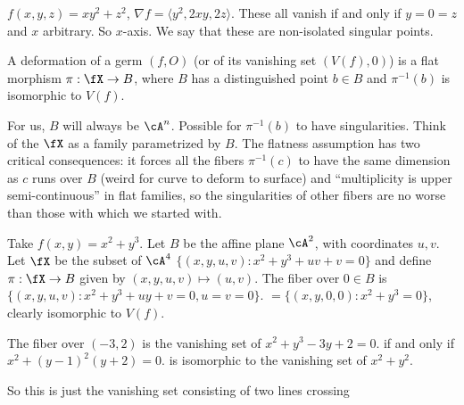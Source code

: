 \begin{ex}
$f(x,y,z)= xy^2+z^2$, $\nabla f=\langle y^2,2xy,2z \rangle$. These all vanish if and only if $y=0=z$ and $x$ arbitrary. So $x$-axis. We say that these are non-isolated singular points. 
\end{ex}



\begin{dfn}[Deformation]
A deformation of a germ $(f,O)$ (or of its vanishing set $(V(f),0)$) is a flat morphism $\pi: \fX \to B$, where $B$ has a distinguished point $b \in B$ and $\pi^{-1}(b)$ is isomorphic to $V(f)$.
\end{dfn}

For us, $B$ will always be $\cA^n$. Possible for $\pi^{-1}(b)$ to have singularities. Think of the $\fX$ as a family parametrized by $B$. The flatness assumption has two critical consequences: it forces all the fibers $\pi^{-1}(c)$ to have the same dimension as $c$ runs over $B$ (weird for curve to deform to surface) and ``multiplicity is upper semi-continuous'' in flat families, so the singularities of other fibers are no worse than those with which we started with. 



\begin{ex}
Take $f(x,y)= x^2+y^3$. Let $B$ be the affine plane $\cA^2$, with coordinates $u,v$. Let $\fX$ be the subset of $\cA^4$ $\{(x,y,u,v) \colon x^2+y^3+uv+v=0\}$ and define $\pi: \fX \to B$ given by $(x,y,u,v) \mapsto (u,v)$. The fiber over $0 \in B$ is $\{(x,y,u,v) \colon x^2+y^3+uy+v=0, u=v=0\}$. $=\{(x,y,0,0) \colon x^2+y^3=0\}$, clearly isomorphic to $V(f)$. 

The fiber over $(-3,2)$ is the vanishing set of $x^2+y^3-3y+2=0$. if and only if $x^2+(y-1)^2(y+2)=0$. is isomorphic to the vanishing set of $x^2+y^2$.  %

So this is just the vanishing set consisting of two lines crossing 
\end{ex}










